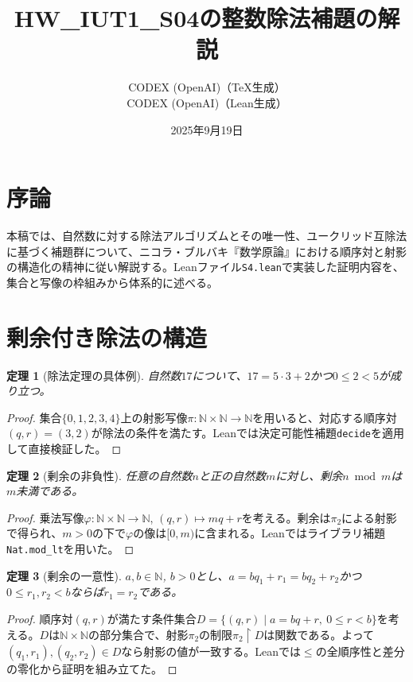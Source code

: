 \documentclass[12pt]{article}
\title{HW\_IUT1\_S04の整数除法補題の解説}
\author{CODEX (OpenAI)（TeX生成）\\CODEX (OpenAI)（Lean生成）}
\date{2025年9月19日}
\theoremstyle{definition}
\theoremstyle{plain}
\newtheorem{theorem}{定理}
\begin{document}
\maketitle

\section*{序論}
本稿では、自然数に対する除法アルゴリズムとその唯一性、ユークリッド互除法に基づく補題群について、ニコラ・ブルバキ『数学原論』における順序対と射影の構造化の精神に従い解説する。Leanファイル\texttt{S4.lean}で実装した証明内容を、集合と写像の枠組みから体系的に述べる。

\section{剰余付き除法の構造}
\begin{theorem}[除法定理の具体例]
自然数$17$について、$17 = 5\cdot 3 + 2$かつ$0 \leq 2 < 5$が成り立つ。
\end{theorem}
\begin{proof}
集合$\{0,1,2,3,4\}$上の射影写像$\pi\colon \mathbb{N}\times\mathbb{N} \to \mathbb{N}$を用いると、対応する順序対$(q,r)=(3,2)$が除法の条件を満たす。Leanでは決定可能性補題\texttt{decide}を適用して直接検証した。
\end{proof}

\begin{theorem}[剰余の非負性]
任意の自然数$n$と正の自然数$m$に対し、剰余$n \bmod m$は$m$未満である。
\end{theorem}
\begin{proof}
乗法写像$\varphi\colon \mathbb{N}\times\mathbb{N} \to \mathbb{N}$, $(q,r)\mapsto mq+r$を考える。剰余は$\pi_2$による射影で得られ、$m>0$の下で$\varphi$の像は$[0,m)$に含まれる。Leanではライブラリ補題\texttt{Nat.mod\_lt}を用いた。
\end{proof}

\begin{theorem}[剰余の一意性]
$a,b\in\mathbb{N}$, $b>0$とし、$a = bq_1 + r_1 = bq_2 + r_2$かつ$0\le r_1,r_2<b$ならば$r_1=r_2$である。
\end{theorem}
\begin{proof}
順序対$(q,r)$が満たす条件集合$D=\{(q,r)\mid a=bq+r,\ 0\le r<b\}$を考える。$D$は$\mathbb{N}\times\mathbb{N}$の部分集合で、射影$\pi_2$の制限$\pi_2\restriction D$は関数である。よって$(q_1,r_1),(q_2,r_2)\in D$なら射影の値が一致する。Leanでは$\le$の全順序性と差分の零化から証明を組み立てた。
\end{proof}
\end{document}
